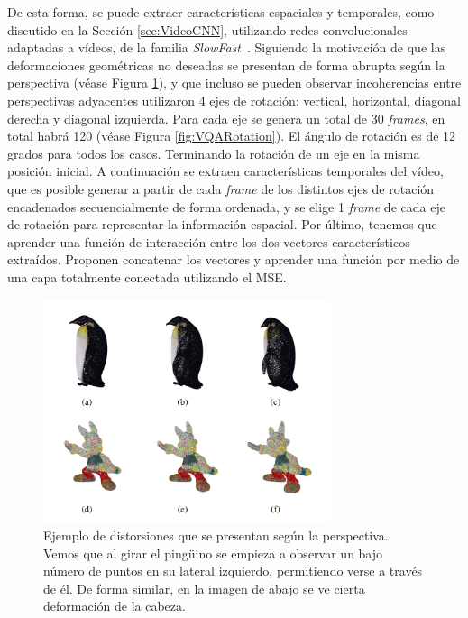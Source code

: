 De esta forma, se puede extraer características espaciales y temporales, como 
discutido en la Sección \ref{sec:VideoCNN}, utilizando redes convolucionales 
adaptadas a vídeos, de la familia \emph{SlowFast}~\cite{SlowFastNetworks}.
Siguiendo la motivación de que las deformaciones geométricas no deseadas se presentan 
de forma abrupta según la perspectiva (véase Figura \ref{fig:ViewPoint}), y que 
incluso se pueden observar incoherencias entre perspectivas adyacentes
utilizaron 4 ejes de rotación: vertical, horizontal, diagonal derecha 
y diagonal izquierda. Para cada eje se genera un total de 30 \emph{frames}, 
en total habrá 120 (véase Figura \ref{fig:VQARotation}). El ángulo de rotación es de 12 grados para todos los casos. 
Terminando la rotación de un eje en la misma posición inicial. 
A continuación se extraen características temporales del vídeo, que es posible 
generar a partir de cada \emph{frame} de los distintos ejes de rotación encadenados
secuencialmente de forma ordenada, y se elige 1 \emph{frame} de cada 
eje de rotación para representar la información espacial. Por último, 
tenemos que aprender una función de interacción entre los dos vectores característicos 
extraídos. Proponen concatenar los vectores y aprender una función por 
medio de una capa totalmente conectada utilizando el MSE.

\begin{figure}
  \begin{center}
    \includegraphics[width=0.75\textwidth]{imagenes/chapter4/ViewPoint}
  \end{center}
  \caption[Ejemplo de distorsiones que se presentan según la perspectiva.]{
  Ejemplo de distorsiones que se presentan según la perspectiva.
Vemos que al girar el pingüino se empieza a observar un bajo número de puntos en su 
lateral izquierdo, permitiendo verse a través de él. De forma similar, 
en la imagen de abajo se ve cierta deformación de la cabeza.}
  \label{fig:ViewPoint}
\end{figure}


